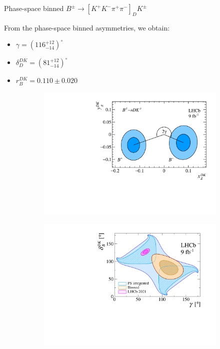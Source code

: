 \documentclass[dvipsnames]{beamer}
\begin{document}
\begin{frame}{Phase-space binned $B^\pm\to[K^+K^-\pi^+\pi^-]_DK^\pm$}
  \begin{center}
    \large From the phase-space binned asymmetries, we obtain:
  \end{center}
  \begin{itemize}
    \item{$\gamma = (116^{+12}_{-14})^\circ$}
    \item{$\delta_D^{DK} = (81^{+12}_{-14})^\circ$}
    \item{$r_B^{DK} = 0.110 \pm 0.020$}
  \end{itemize}
  \vspace{-0.2cm}
  \begin{figure}[htb]
    \centering
    \begin{subfigure}{0.5\textwidth}
      \includegraphics[width=1\textwidth]{Plots/B2DK_CP_Observables_Contours.pdf}
    \end{subfigure}%
    \begin{subfigure}{0.5\textwidth}
      \includegraphics[width=1\textwidth]{Plots/gammacharm_lhcb_KKpipi_GLW_KKpipi_GGSZ_lhcb_2020_beauty_and_charm_g_d_dk.pdf}

\end{subfigure}
\end{figure}
\end{frame}
\end{document}
